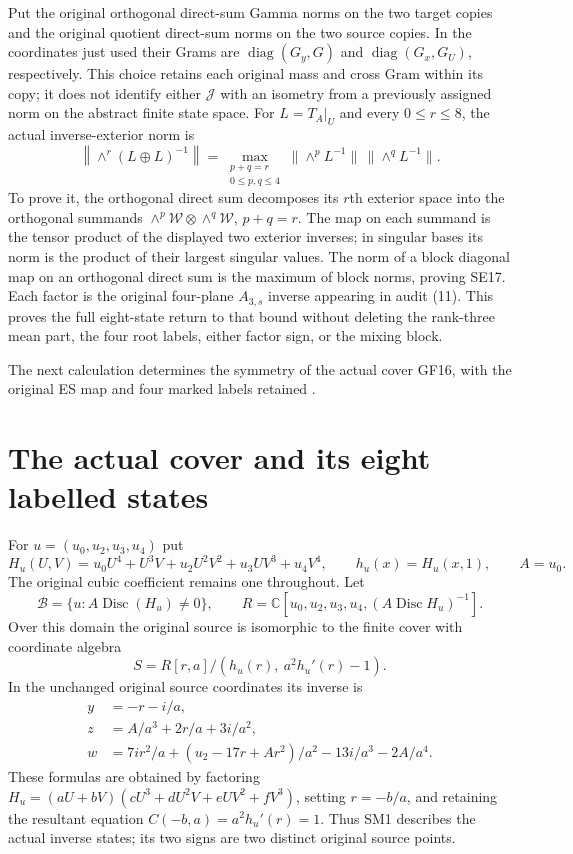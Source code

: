 \documentclass[11pt]{article}
\newcommand{\C}{\mathbb C}
\newcommand{\diag}{\operatorname{diag}}
\begin{document}
Put the original orthogonal direct-sum Gamma norms on the two target
copies and the original quotient direct-sum norms on the two source
copies. In the coordinates just used their Grams are
$\diag(G_y,G)$ and $\diag(G_x,G_U)$, respectively. This choice
retains each original mass and cross Gram within its copy; it does
not identify either $\mathcal J$ with an isometry from a previously
assigned norm on the abstract finite state space. For $L=T_A|_U$
and every $0\le r\le8$, the actual inverse-exterior norm is
\[
 \left\|\wedge^r(L\oplus L)^{-1}\right\|
 =\max_{\substack{p+q=r\\0\le p,q\le4}}
          \|\wedge^pL^{-1}\|\,\|\wedge^qL^{-1}\|.
 \tag{SE17}
\]
To prove it, the orthogonal direct sum decomposes its $r$th exterior
space into the orthogonal summands
$\wedge^p\mathcal W\otimes\wedge^q\mathcal W$, $p+q=r$.
The map on each summand is the tensor product of the displayed
two exterior inverses; in singular bases its norm is the product
of their largest singular values. The norm of a block diagonal
map on an orthogonal direct sum is the maximum of block norms,
proving SE17. Each factor is the original four-plane $A_{3,s}$
inverse appearing in audit (11). This proves the full eight-state
return to that bound without deleting the rank-three mean part,
the four root labels, either factor sign, or the mixing block.

\providecommand{\Disc}{\operatorname{Disc}}
\providecommand{\sgn}{\operatorname{sgn}}
\providecommand{\Aut}{\operatorname{Aut}}
The next calculation determines the symmetry of the actual cover GF16,
with the original ES map and four marked labels retained \cite{ES488}.

\section{The actual cover and its eight labelled states}
For $u=(u_0,u_2,u_3,u_4)$ put
\[
 H_u(U,V)=u_0U^4+U^3V+u_2U^2V^2+u_3UV^3+u_4V^4,
 \qquad h_u(x)=H_u(x,1),\qquad A=u_0.
\]
The original cubic coefficient remains one throughout. Let
\[
 \mathcal B=\{u:A\Disc(H_u)\ne0\},\qquad
 R=\C[u_0,u_2,u_3,u_4,(A\Disc H_u)^{-1}].
\]
Over this domain the original source is isomorphic to the finite
cover with coordinate algebra
\begin{equation}
 S=R[r,a]/(h_u(r),\ a^2h_u'(r)-1).\tag{SM1}
\end{equation}
In the unchanged original source coordinates its inverse is
\begin{align}
 y&=-r-i/a,\nonumber\\
 z&=A/a^3+2r/a+3i/a^2,\nonumber\\
 w&=7ir^2/a+(u_2-17r+Ar^2)/a^2-13i/a^3-2A/a^4.
 \tag{SM2}
\end{align}
These formulas are obtained by factoring
$H_u=(aU+bV)(cU^3+dU^2V+eUV^2+fV^3)$, setting $r=-b/a$,
and retaining the resultant equation
$C(-b,a)=a^2h_u'(r)=1$. Thus SM1 describes the actual inverse
states; its two signs are two distinct original source points.
\end{document}
